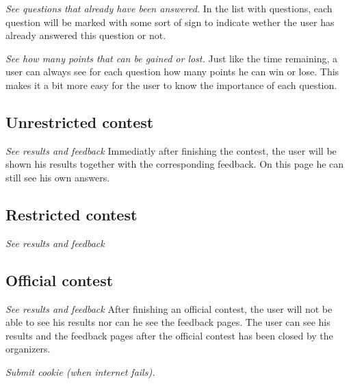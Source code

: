 \textit{See questions that already have been answered.} 
In the list with questions, each question will be marked with some sort of sign to indicate wether the user has already answered this question or not. 

\textit{See how many points that can be gained or lost.}
Just like the time remaining, a user can always see for each question how many points he can win or lose. This makes it a bit more easy for the user to know the importance of each question. 

\subsection*{Unrestricted contest}

\textit{See results and feedback}
Immediatly after finishing the contest, the user will be shown his results together with the corresponding feedback. On this page he can still see his own answers. 

\subsection*{Restricted contest}

\textit{See results and feedback}


\subsection*{Official contest}

\textit{See results and feedback}
After finishing an official contest, the user will not be able to see his results nor can he see the feedback pages. The user can see his results and the feedback pages after the official contest has been closed by the organizers. 

\textit{Submit cookie (when internet fails).} 



